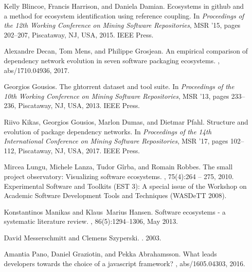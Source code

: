 \documentclass[10pt,conference]{IEEEtran}
\begin{document}
\begin{thebibliography}{00}

  Kelly Blincoe, Francis Harrison, and Daniela Damian.
  \newblock Ecosystems in github and a method for ecosystem identification using
    reference coupling.
  \newblock In {\em Proceedings of the 12th Working Conference on Mining Software
    Repositories}, MSR '15, pages 202--207, Piscataway, NJ, USA, 2015. IEEE
    Press.
  
  Alexandre Decan, Tom Mens, and Philippe Grosjean.
  \newblock An empirical comparison of dependency network evolution in seven
    software packaging ecosystems.
  , abs/1710.04936, 2017.
  
  Georgios Gousios.
  \newblock The ghtorrent dataset and tool suite.
  \newblock In {\em Proceedings of the 10th Working Conference on Mining Software
    Repositories}, MSR '13, pages 233--236, Piscataway, NJ, USA, 2013. IEEE
    Press.
  
  Riivo Kikas, Georgios Gousios, Marlon Dumas, and Dietmar Pfahl.
  \newblock Structure and evolution of package dependency networks.
  \newblock In {\em Proceedings of the 14th International Conference on Mining
    Software Repositories}, MSR '17, pages 102--112, Piscataway, NJ, USA, 2017.
    IEEE Press.
  
  Mircea Lungu, Michele Lanza, Tudor Gîrba, and Romain Robbes.
  \newblock The small project observatory: Visualizing software ecosystems.
  , 75(4):264 -- 275, 2010.
  \newblock Experimental Software and Toolkits (EST 3): A special issue of the
    Workshop on Academic Software Development Tools and Techniques (WASDeTT
    2008).
  
  Konstantinos Manikas and Klaus~Marius Hansen.
  \newblock Software ecosystems - a systematic literature review.
  , 86(5):1294--1306, May 2013.
  
  David Messerschmitt and Clemens Szyperski.
  .
   2003.
  
  Amantia Pano, Daniel Graziotin, and Pekka Abrahamsson.
  \newblock What leads developers towards the choice of a javascript framework?
  , abs/1605.04303, 2016.
  

\end{thebibliography}
\end{document}
